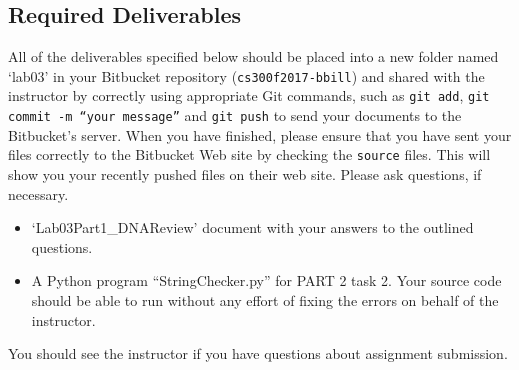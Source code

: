 
\vspace*{-.2in}
\subsection*{Required Deliverables}
\vspace*{-.1in}
All of the deliverables specified below should be placed into a new folder named `lab03' in your Bitbucket repository ({\tt cs300f2017-bbill})  and shared with the instructor by correctly using  appropriate Git commands, such as {\tt git add}, {\tt git commit -m ``your message''} and {\tt git push} to send your documents to the Bitbucket's server. When you have finished, please ensure that you have sent your files correctly to the Bitbucket Web site by checking the {\tt source} files. This will show you your recently pushed files on their web site. Please ask questions, if necessary.
\color{red}

\begin{itemize}
	\item `Lab03Part1\_DNAReview' document with your answers to the outlined questions.
	\item A Python program ``StringChecker.py''  for PART 2 task 2. Your source code should be able to run without any effort of fixing the errors on behalf of the instructor.
\end{itemize}
\color{black}

\noindent You should see the instructor if you have questions about assignment submission.

